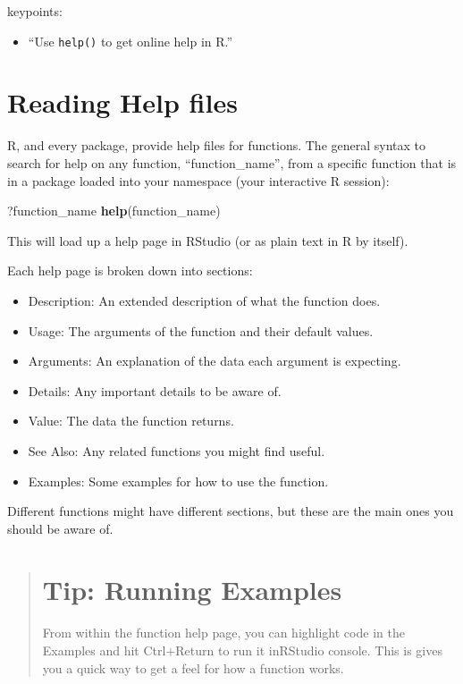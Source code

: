 \documentclass[]{book}
\newenvironment{Shaded}{\begin{snugshade}}{\end{snugshade}}
\newcommand{\KeywordTok}[1]{\textcolor[rgb]{0.13,0.29,0.53}{\textbf{#1}}}
\newcommand{\NormalTok}[1]{#1}
\providecommand{\tightlist}{%
  \setlength{\itemsep}{0pt}\setlength{\parskip}{0pt}}
\begin{document}
keypoints:

\begin{itemize}
\tightlist
\item
  ``Use \texttt{help()} to get online help in R.''
\end{itemize}

\section{Reading Help files}\label{reading-help-files}

R, and every package, provide help files for functions. The general
syntax to search for help on any function, ``function\_name'', from a
specific function that is in a package loaded into your namespace (your
interactive R session):

\begin{Shaded}
\begin{Highlighting}[]
\NormalTok{?function_name}
\KeywordTok{help}\NormalTok{(function_name)}
\end{Highlighting}
\end{Shaded}

This will load up a help page in RStudio (or as plain text in R by
itself).

Each help page is broken down into sections:

\begin{itemize}
\tightlist
\item
  Description: An extended description of what the function does.
\item
  Usage: The arguments of the function and their default values.
\item
  Arguments: An explanation of the data each argument is expecting.
\item
  Details: Any important details to be aware of.
\item
  Value: The data the function returns.
\item
  See Also: Any related functions you might find useful.
\item
  Examples: Some examples for how to use the function.
\end{itemize}

Different functions might have different sections, but these are the
main ones you should be aware of.

\begin{quote}
\section{Tip: Running Examples}\label{tip-running-examples}

From within the function help page, you can highlight code in the
Examples and hit Ctrl+Return to run it inRStudio console. This is gives
you a quick way to get a feel for how a function works.
\end{quote}
\end{document}

